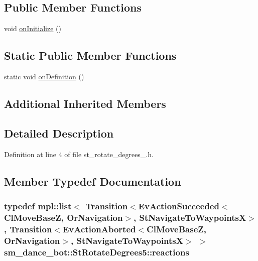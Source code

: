 \subsection*{Public Member Functions}
\begin{DoxyCompactItemize}
\item 
void \hyperlink{structsm__dance__bot_1_1StRotateDegrees5_a7895e3520bfa142aa23cba7c5bffdb73}{on\+Initialize} ()
\end{DoxyCompactItemize}
\subsection*{Static Public Member Functions}
\begin{DoxyCompactItemize}
\item 
static void \hyperlink{structsm__dance__bot_1_1StRotateDegrees5_a26e65c735f1ac950f14b108f51fa3349}{on\+Definition} ()
\end{DoxyCompactItemize}
\subsection*{Additional Inherited Members}


\subsection{Detailed Description}


Definition at line 4 of file st\+\_\+rotate\+\_\+degrees\+\_.\+h.



\subsection{Member Typedef Documentation}
\subsubsection[{\texorpdfstring{reactions}{reactions}}]{\setlength{\rightskip}{0pt plus 5cm}typedef mpl\+::list$<$ Transition$<$Ev\+Action\+Succeeded$<${\bf Cl\+Move\+BaseZ}, {\bf Or\+Navigation}$>$, {\bf St\+Navigate\+To\+WaypointsX}$>$, Transition$<$Ev\+Action\+Aborted$<${\bf Cl\+Move\+BaseZ}, {\bf Or\+Navigation}$>$, {\bf St\+Navigate\+To\+WaypointsX}$>$ $>$ {\bf sm\+\_\+dance\+\_\+bot\+::\+St\+Rotate\+Degrees5\+::reactions}}\hypertarget{structsm__dance__bot_1_1StRotateDegrees5_a4a656e380d1f371b16d3daf9361cdf23}{}\label{structsm__dance__bot_1_1StRotateDegrees5_a4a656e380d1f371b16d3daf9361cdf23}



